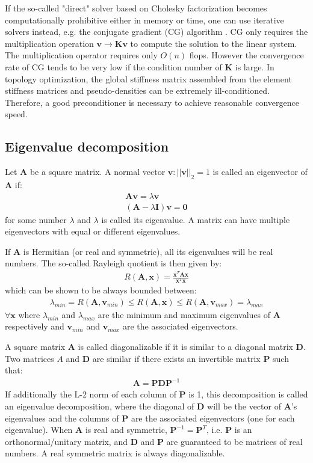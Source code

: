 If the so-called "direct" solver based on Cholesky factorization becomes computationally prohibitive either in memory or time, one can use iterative solvers instead, e.g. the conjugate gradient (CG) algorithm \citep{Golub1996}. CG only requires the multiplication operation $\bm{v} \to \bm{K} \bm{v}$ to compute the solution to the linear system. The multiplication operator requires only $O(n)$ flops. However the convergence rate of CG tends to be very low if the condition number of $\bm{K}$ is large. In topology optimization, the global stiffness matrix assembled from the element stiffness matrices and pseudo-densities can be extremely ill-conditioned. Therefore, a good preconditioner is necessary to achieve reasonable convergence speed.

\subsection{Eigenvalue decomposition}

Let $\bm{A}$ be a square matrix. A normal vector $\bm{v} : ||\bm{v}||_2 = 1$ is called an eigenvector of $\bm{A}$ if:
\begin{align}
    \bm{A} \bm{v} = \lambda \bm{v} \\
    (\bm{A} - \lambda \bm{I}) \bm{v} = \bm{0}
\end{align}
for some number $\lambda$ and $\lambda$ is called its eigenvalue. A matrix can have multiple eigenvectors with equal or different eigenvalues.

If $\bm{A}$ is Hermitian (or real and symmetric), all its eigenvalues will be real numbers. The so-called Rayleigh quotient is then given by:
\begin{align}
    R(\bm{A}, \bm{x}) = \frac{\bm{x}^T \bm{A} \bm{x}}{\bm{x}^T \bm{x}}
\end{align}
which can be shown to be always bounded between:
\begin{align}
    \lambda_{min} = R(\bm{A}, \bm{v}_{min}) \leq R(\bm{A}, \bm{x}) \leq R(\bm{A}, \bm{v}_{max}) = \lambda_{max}
\end{align}
$\forall \bm{x}$ where $\lambda_{min}$ and $\lambda_{max}$ are the minimum and maximum eigenvalues of $\bm{A}$ respectively and $\bm{v}_{min}$ and $\bm{v}_{max}$ are the associated eigenvectors.

A square matrix $\bm{A}$ is called diagonalizable if it is similar to a diagonal matrix $\bm{D}$. Two matrices ${A}$ and $\bm{D}$ are similar if there exists an invertible matrix $\bm{P}$ such that:
\begin{align}
    \bm{A} = \bm{P} \bm{D} \bm{P}^{-1}
\end{align}
If additionally the L-2 norm of each column of $\bm{P}$ is 1, this decomposition is called an eigenvalue decomposition, where the diagonal of $\bm{D}$ will be the vector of $\bm{A}$'s eigenvalues and the columns of $\bm{P}$ are the associated eigenvectors (one for each eigenvalue). When $\bm{A}$ is real and symmetric, $\bm{P}^{-1} = \bm{P}^T$, i.e. $\bm{P}$ is an orthonormal/unitary matrix, and $\bm{D}$ and $\bm{P}$ are guaranteed to be matrices of real numbers. A real symmetric matrix is always diagonalizable.


